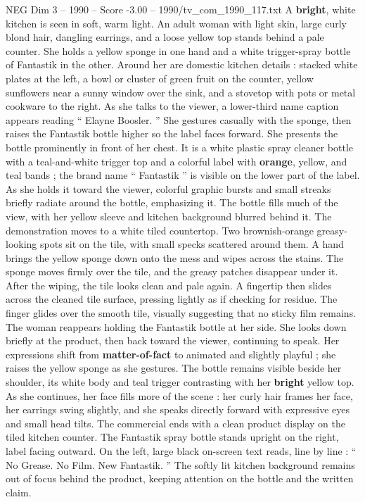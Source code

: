 \begin{textsample}{NEG Dim 3 – 1990 – Score -3.00 – 1990/tv\_com\_1990\_117.txt}  \label{ex:f3_neg_042}
A \textbf{bright}, white kitchen is seen in soft, warm light.
An adult woman with light skin, large curly blond hair, dangling earrings, and a loose yellow top stands behind a pale counter.
She holds a yellow sponge in one hand and a white trigger-spray bottle of Fantastik in the other.
Around her are domestic kitchen details : stacked white plates at the left, a bowl or cluster of green fruit on the counter, yellow sunflowers near a sunny window over the sink, and a stovetop with pots or metal cookware to the right.
As she talks to the viewer, a lower-third name caption appears reading “ Elayne Boosler. ” She gestures casually with the sponge, then raises the Fantastik bottle higher so the label faces forward.
She presents the bottle prominently in front of her chest.
It is a white plastic spray cleaner bottle with a teal-and-white trigger top and a colorful label with \textbf{orange}, yellow, and teal bands ; the brand name “ Fantastik ” is visible on the lower part of the label.
As she holds it toward the viewer, colorful graphic bursts and small streaks briefly radiate around the bottle, emphasizing it.
The bottle fills much of the view, with her yellow sleeve and kitchen background blurred behind it.
The demonstration moves to a white tiled countertop.
Two brownish-orange greasy-looking spots sit on the tile, with small specks scattered around them.
A hand brings the yellow sponge down onto the mess and wipes across the stains.
The sponge moves firmly over the tile, and the greasy patches disappear under it.
After the wiping, the tile looks clean and pale again.
A fingertip then slides across the cleaned tile surface, pressing lightly as if checking for residue.
The finger glides over the smooth tile, visually suggesting that no sticky film remains.
The woman reappears holding the Fantastik bottle at her side.
She looks down briefly at the product, then back toward the viewer, continuing to speak.
Her expressions shift from \textbf{matter-of-fact} to animated and slightly playful ; she raises the yellow sponge as she gestures.
The bottle remains visible beside her shoulder, its white body and teal trigger contrasting with her \textbf{bright} yellow top.
As she continues, her face fills more of the scene : her curly hair frames her face, her earrings swing slightly, and she speaks directly forward with expressive eyes and small head tilts.
The commercial ends with a clean product display on the tiled kitchen counter.
The Fantastik spray bottle stands upright on the right, label facing outward.
On the left, large black on-screen text reads, line by line : “ No Grease.
No Film.
New Fantastik. ” The softly lit kitchen background remains out of focus behind the product, keeping attention on the bottle and the written claim.

\end{textsample}
